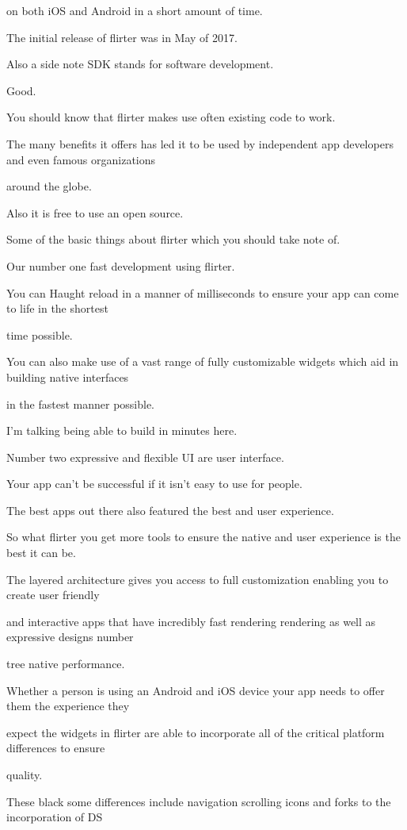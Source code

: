 on both iOS and Android in a short amount of time.

The initial release of flirter was in May of 2017.

Also a side note SDK stands for software development.

Good.

You should know that flirter makes use often existing code to work.

The many benefits it offers has led it to be used by independent app developers and even famous organizations

around the globe.

Also it is free to use an open source.

Some of the basic things about flirter which you should take note of.

Our number one fast development using flirter.

You can Haught reload in a manner of milliseconds to ensure your app can come to life in the shortest

time possible.

You can also make use of a vast range of fully customizable widgets which aid in building native interfaces

in the fastest manner possible.

I'm talking being able to build in minutes here.

Number two expressive and flexible UI are user interface.

Your app can't be successful if it isn't easy to use for people.

The best apps out there also featured the best and user experience.

So what flirter you get more tools to ensure the native and user experience is the best it can be.

The layered architecture gives you access to full customization enabling you to create user friendly

and interactive apps that have incredibly fast rendering rendering as well as expressive designs number

tree native performance.

Whether a person is using an Android and iOS device your app needs to offer them the experience they

expect the widgets in flirter are able to incorporate all of the critical platform differences to ensure

quality.

These black some differences include navigation scrolling icons and forks to the incorporation of DS

